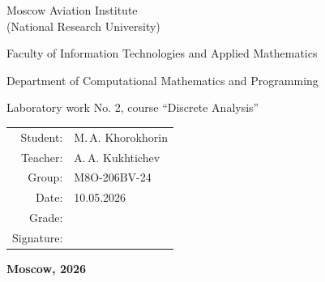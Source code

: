 \begin{titlepage}
\begin{center}
\bfseries

{\Large Moscow Aviation Institute\\ (National Research University)

}

\vspace{48pt}

{\large Faculty of Information Technologies and Applied Mathematics
}

\vspace{36pt}

{\large Department of Computational Mathematics and Programming

}

\vspace{48pt}

Laboratory work No. 2, course \enquote{Discrete Analysis}

\end{center}

\vspace{72pt}

\begin{flushright}
\begin{tabular}{rl}
Student: & M.\,A. Khorokhorin \\
Teacher: & A.\,A. Kukhtichev \\
Group: & M8O-206BV-24 \\
Date: & 10.05.2026 \\
Grade: & \\
Signature: & \\
\end{tabular}
\end{flushright}

\vfill

\begin{center}
\bfseries
Moscow, 2026
\end{center}
\end{titlepage}

\pagebreak
